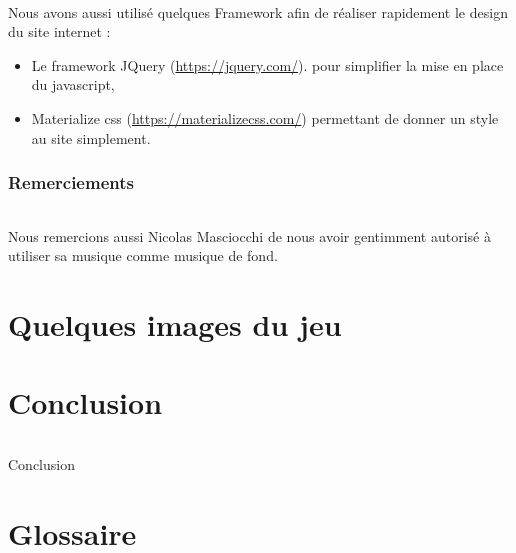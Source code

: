 \documentclass[titlepage, 13px, a4paper]{report}
\begin{document}
\paragraph{} \hspace{0pt}
Nous avons aussi utilisé quelques Framework  afin de réaliser rapidement le design du site internet :
{\begin{itemize}
	\item Le framework JQuery (\url{https://jquery.com/}). pour simplifier la mise en place du javascript,
	\item Materialize css (\url{https://materializecss.com/}) permettant de donner un style au site simplement. \\
\end{itemize}}

\section{Remerciements}
\paragraph{} \hspace{0pt}
Nous remercions aussi Nicolas Masciocchi de nous avoir gentimment autorisé à utiliser sa musique comme musique de fond. \\


\newpage


\part{Quelques images du jeu}



\newpage


\part{Conclusion}
\paragraph{} \hspace{0pt}
Conclusion


\newpage


\part{Glossaire}
\paragraph{} \hspace{0pt}


\end{document}
